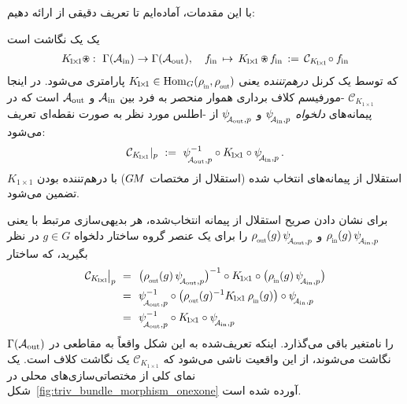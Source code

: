با این مقدمات، آماده‌ایم تا تعریف دقیقی از \onexoneGMs ارائه دهیم:
\begin{dfn}[\onexoneGM]
\label{dfn:onexone}
    یک \onexoneGM یک نگاشت است
    \begin{align}
        K_{\!1\!\times\!1} \ostar :\ \Gamma(\Ain) \to \Gamma(\Aout),\ \ \ 
        \fin \,\mapsto\, K_{\!1\!\times\!1} \,\ostar\, \fin \,:=\, \mathcal{C}_{K_{\!1\!\times\!1}}\! \circ \fin
    \end{align}
    که توسط یک کرنل \emph{درهم‌تننده} \onexoneGM یعنی $K_{\!1\!\times\!1} \in \Hom_G(\rhoin,\rhoout)$ پارامتری می‌شود.
    در اینجا $\mathcal{C}_{K_{\!1\!\times\!1}}$ \lr{M}-مورفیسم کلاف برداری هموار منحصر به فرد بین $\mathcal{A}_\textup{in}$ و $\mathcal{A}_\textup{out}$ است که در پیمانه‌های \emph{دلخواه} $\psiAinp$ و $\psiAoutp$ از -اطلس مورد نظر به صورت نقطه‌ای تعریف می‌شود:
    \begin{align}
        \mathcal{C}_{K_{\!1\!\times\!1}}|_p\ :=\ \psiAoutp^{-1} \circ K_{\!1\!\times\!1} \circ \psiAinp \,.
    \end{align}
    استقلال از پیمانه‌های انتخاب شده (استقلال از مختصات $G\mkern-1.4muM$) با درهم‌تننده بودن $K_{\!1\!\times\!1}$ تضمین می‌شود.
\end{dfn}
برای نشان دادن صریح استقلال از پیمانه انتخاب‌شده، هر بدیهی‌سازی مرتبط با  یعنی $\rhoin(g)\,\psiAinp$ و $\rhoout(g)\,\psiAoutp$ را برای یک عنصر گروه ساختار دلخواه $g\in G$ در نظر بگیرید، که ساختار
\begin{align}
    \mathcal{C}_{K_{\!1\!\times\!1}} \mkern-2mu\big|_p\ 
    =\ \ &\big(\rhoout(g)\, \psiAoutp \big)^{-1} \circ K_{\!1\!\times\!1} \circ \big(\rhoin(g)\, \psiAinp\big) \notag \\
    =\ \ &\psiAoutp^{-1} \circ \big( \rhoout(g)^{-1} K_{\!1\!\times\!1}\, \rhoin(g) \big) \circ \psiAinp \notag \\
    =\ \ &\psiAoutp^{-1} \circ K_{\!1\!\times\!1} \circ \psiAinp
\end{align}
را نامتغیر باقی می‌گذارد.
اینکه \onexoneGMs تعریف‌شده به این شکل واقعاً به مقاطعی در $\Gamma(\mathcal{A}_\textup{out})$ نگاشت می‌شوند، از این واقعیت ناشی می‌شود که $\mathcal{C}_{K_{\!1\!\times\!1}}$ یک نگاشت کلاف است.
یک نمای کلی از مختصاتی‌سازی‌های محلی \onexoneGMs در شکل~\ref{fig:triv_bundle_morphism_onexone} آورده شده است.

